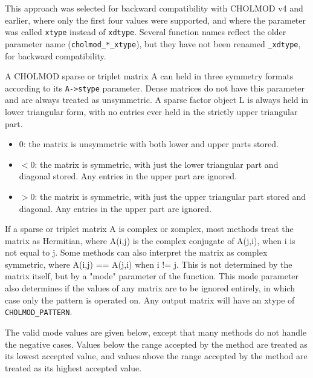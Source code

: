 \documentclass[11pt]{article}
\begin{document}
   This approach was selected for backward compatibility with CHOLMOD v4 and
   earlier, where only the first four values were supported, and where the
   parameter was called \verb'xtype' instead of \verb'xdtype'.  Several
   function names reflect the older parameter name (\verb'cholmod_*_xtype'),
   but they have not been renamed \verb"_xdtype", for backward compatibility.

   A CHOLMOD sparse or triplet matrix A can held in three symmetry formats
   according to its \verb'A->stype' parameter.  Dense matrices do not have this
   parameter and are always treated as unsymmetric.  A sparse factor object L
   is always held in lower triangular form, with no entries ever held in the
   strictly upper triangular part.

    \begin{itemize}
    \item
        0:  the matrix is unsymmetric with both lower and upper parts stored.

    \item
        $<0$: the matrix is symmetric, with just the lower triangular part and
            diagonal stored.  Any entries in the upper part are ignored.

    \item
        $>0$: the matrix is symmetric, with just the upper triangular part
        stored and diagonal.  Any entries in the upper part are ignored.
    \end{itemize}

   If a sparse or triplet matrix A is complex or zomplex, most methods treat
   the matrix as Hermitian, where A(i,j) is the complex conjugate of A(j,i),
   when i is not equal to j.  Some methods can also interpret the matrix as
   complex symmetric, where A(i,j) == A(j,i) when i != j.  This is not
   determined by the matrix itself, but by a "mode" parameter of the function.
   This mode parameter also determines if the values of any matrix are to be
   ignored entirely, in which case only the pattern is operated on.  Any output
   matrix will have an xtype of \verb'CHOLMOD_PATTERN'.

   The valid mode values are given below, except that many methods do not
   handle the negative cases.  Values below the range accepted by the method
   are treated as its lowest accepted value, and values above the range
   accepted by the method are treated as its highest accepted value.
\end{document}
